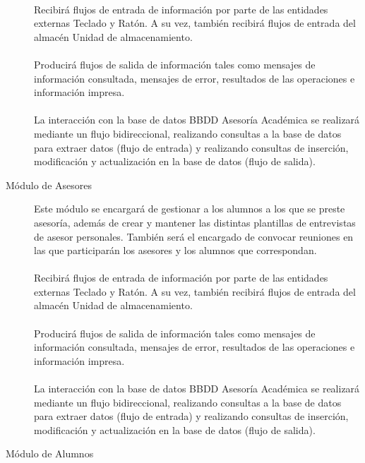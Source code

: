 \begin{description}
   \paragraph{}Recibirá flujos de entrada de información por parte de las
   entidades externas Teclado y Ratón. A su vez, también recibirá flujos de
   entrada del almacén Unidad de almacenamiento.

   \paragraph{}Producirá flujos de salida de información tales como mensajes de
   información consultada, mensajes de error, resultados de las operaciones e
   información impresa.

   \paragraph{}La interacción con la base de datos BBDD Asesoría Académica se
   realizará mediante un flujo bidireccional, realizando consultas a la base de
   datos para extraer datos (flujo de entrada) y realizando consultas de
   inserción, modificación y actualización en la base de datos (flujo de
   salida).

   \item[Módulo de Asesores] Este módulo se encargará de gestionar a los alumnos
   a los que se preste asesoría, además de crear y mantener las distintas
   plantillas de entrevistas de asesor personales. También será el encargado
   de convocar reuniones en las que participarán los asesores y los alumnos
   que correspondan.

   \paragraph{}Recibirá flujos de entrada de información por parte de las
   entidades externas Teclado y Ratón. A su vez, también recibirá flujos de
   entrada del almacén Unidad de almacenamiento.

   \paragraph{}Producirá flujos de salida de información tales como mensajes de
   información consultada, mensajes de error, resultados de las operaciones e
   información impresa.

   \paragraph{}La interacción con la base de datos BBDD Asesoría Académica se
   realizará mediante un flujo bidireccional, realizando consultas a la base de
   datos para extraer datos (flujo de entrada) y realizando consultas de
   inserción, modificación y actualización en la base de datos (flujo de
   salida).

   \item[Módulo de Alumnos]
  \end{description}

